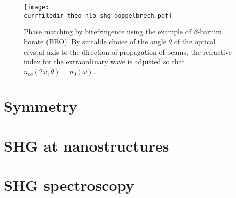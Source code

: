 \begin{figure}
\center
\texttt{[image: \\currfiledir theo\_nlo\_shg\_doppelbrech.pdf]}
\caption{Phase matching by birefringence using the example of
$\beta$-barium borate (BBO). By suitable choice of the angle
$\theta$ of the optical crystal axis to the direction of propagation of
beams, the refractive index for the extraordinary wave is adjusted
so that $n_{eo}(2 \omega, \theta) = n_0(\omega)$. }
\label{fig_shg_birefringence}

\end{figure}



\section{Symmetry}


\section{SHG at nanostructures}


\section{SHG spectroscopy}





\printbibliography[segment=\therefsegment,heading=subbibliography]
